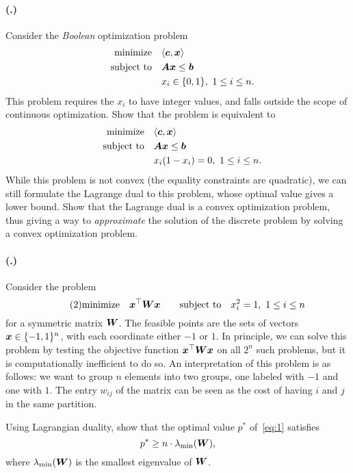 \documentclass{article}
\newcounter{problemSheetNumber}
\newcounter{problems}
\renewcommand{\problem}{\paragraph{(\theproblemSheetNumber.\theproblems)}\addtocounter{problems}{1}}
\begin{document}
\problem Consider the {\em Boolean} optimization problem
\begin{align*}
\text{minimize}\quad & \langle {\bm{c}}, {\bm{x}} \rangle \\
\quad\text{subject to}\quad & \bm{A}\bm{x}\leq \bm{b}\\
& x_i \in \{0,1\}, \ 1\leq i\leq n.
\end{align*}
This problem requires the $x_i$ to have integer values, and falls outside the scope of continuous optimization. Show that the problem is equivalent to
\begin{align*}
\text{minimize}\quad & \langle {\bm{c}}, {\bm{x}} \rangle \\
\quad\text{subject to}\quad & \bm{A}\bm{x}\leq \bm{b}\\
& x_i(1-x_i)=0, \ 1\leq i\leq n.
\end{align*}
While this problem is not convex (the equality constraints are quadratic), we can still formulate the Lagrange dual to this problem, whose optimal value gives a lower bound. Show that the Lagrange dual is a convex optimization problem, thus giving a way to {\em approximate} the solution of the discrete problem by solving a convex optimization problem.

\problem Consider the problem
\begin{equation}\label{eq:1}\tag{2}
 \text{minimize}\quad \bm{x}^{\top}\bm{W}\bm{x} \quad \quad\text{subject to}\quad x_i^2=1, \ 1\leq i\leq n
\end{equation}
for a symmetric matrix $\bm{W}$.
The feasible points are the sets of vectors $\bm{x}\in \{-1,1\}^n$, with each coordinate either $-1$ or $1$. In principle, we can solve this problem by testing the objective function $\bm{x}^{\top}\bm{W}\bm{x}$ on all $2^n$ such problems, but it is computationally inefficient to do so. An interpretation of this problem is as follows: we want to group $n$ elements into two groups, one labeled with $-1$ and one with $1$. The entry $w_{ij}$ of the matrix can be seen as the cost of having $i$ and $j$ in the same partition.

Using Lagrangian duality, show that the optimal value $p^*$ of~\eqref{eq:1} satisfies
\begin{equation*}
 p^* \geq n \cdot \lambda_{\mathrm{min}}(\bm{W}),
\end{equation*}
where $\lambda_{\mathrm{min}}(\bm{W})$ is the smallest eigenvalue of $\bm{W}$.
\end{document}
